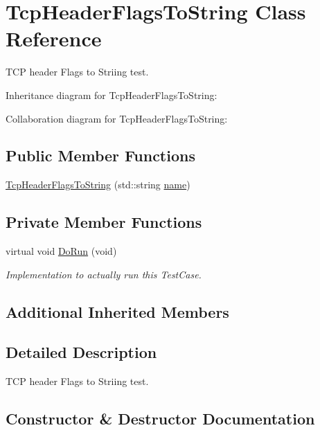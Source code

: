 \hypertarget{classTcpHeaderFlagsToString}{}\section{Tcp\+Header\+Flags\+To\+String Class Reference}
\label{classTcpHeaderFlagsToString}


T\+CP header Flags to Striing test.  




Inheritance diagram for Tcp\+Header\+Flags\+To\+String\+:


Collaboration diagram for Tcp\+Header\+Flags\+To\+String\+:
\subsection*{Public Member Functions}
\begin{DoxyCompactItemize}
\item 
\hyperlink{classTcpHeaderFlagsToString_aad1fa132111bf500a4800c45a8578f58}{Tcp\+Header\+Flags\+To\+String} (std\+::string \hyperlink{generate__test__data__lte__spectrum__model_8m_ab74e6bf80237ddc4109968cedc58c151}{name})
\end{DoxyCompactItemize}
\subsection*{Private Member Functions}
\begin{DoxyCompactItemize}
\item 
virtual void \hyperlink{classTcpHeaderFlagsToString_af1b400751bc7f7a33e357f5bd487ee3f}{Do\+Run} (void)
\begin{DoxyCompactList}\small\item\em Implementation to actually run this Test\+Case. \end{DoxyCompactList}\end{DoxyCompactItemize}
\subsection*{Additional Inherited Members}


\subsection{Detailed Description}
T\+CP header Flags to Striing test. 

\subsection{Constructor \& Destructor Documentation}
